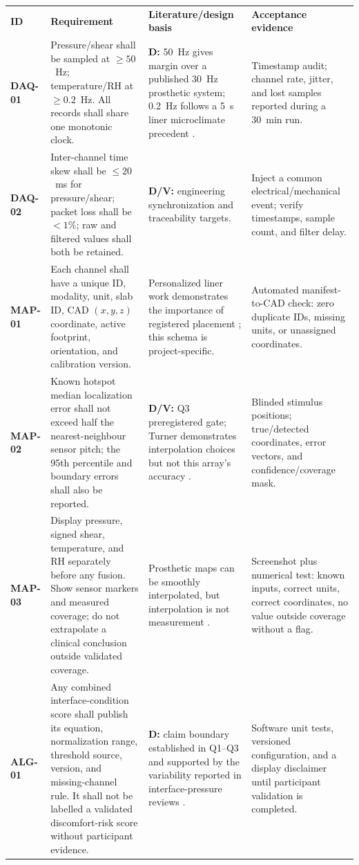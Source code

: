 \vspace{0.45em}
\begingroup
\fontsize{8.2}{9.6}\selectfont
\setlength{\tabcolsep}{3pt}\renewcommand{\arraystretch}{1.11}
\begin{tabularx}{\linewidth}{>{\raggedright\arraybackslash\bfseries\color{AUBRed}}p{1.25cm}Y Y Y}
\color{white}\textbf{ID} & \color{white}\textbf{Requirement} &
\color{white}\textbf{Literature/design basis} & \color{white}\textbf{Acceptance evidence} \\
DAQ-01 & Pressure/shear shall be sampled at $\geq50$~Hz; temperature/RH at
$\geq0.2$~Hz. All records shall share one monotonic clock. & \textbf{D:}
50~Hz gives margin over a published 30~Hz prosthetic system; 0.2~Hz follows a
5~s liner microclimate precedent \cite{q3kwak2020,paterno2020}. & Timestamp
audit; channel rate, jitter, and lost samples reported during a 30~min run. \\
DAQ-02 & Inter-channel time skew shall be $\leq20$~ms for pressure/shear; packet
loss shall be $<1\%$; raw and filtered values shall both be retained. &
\textbf{D/V:} engineering synchronization and traceability targets. & Inject a
common electrical/mechanical event; verify timestamps, sample count, and filter
delay. \\
MAP-01 & Each channel shall have a unique ID, modality, unit, slab ID, CAD
$(x,y,z)$ coordinate, active footprint, orientation, and calibration version. &
Personalized liner work demonstrates the importance of registered placement
\cite{paterno2020}; this schema is project-specific. & Automated manifest-to-CAD
check: zero duplicate IDs, missing units, or unassigned coordinates. \\
MAP-02 & Known hotspot median localization error shall not exceed half the
nearest-neighbour sensor pitch; the 95th percentile and boundary errors shall
also be reported. & \textbf{D/V:} Q3 preregistered gate; Turner demonstrates
interpolation choices but not this array's accuracy \cite{q3turner2021}. &
Blinded stimulus positions; true/detected coordinates, error vectors, and
confidence/coverage mask. \\
MAP-03 & Display pressure, signed shear, temperature, and RH separately before
any fusion. Show sensor markers and measured coverage; do not extrapolate a
clinical conclusion outside validated coverage. & Prosthetic maps can be
smoothly interpolated, but interpolation is not measurement
\cite{q3turner2021}. & Screenshot plus numerical test: known inputs, correct
units, correct coordinates, no value outside coverage without a flag. \\
ALG-01 & Any combined interface-condition score shall publish its equation,
normalization range, threshold source, version, and missing-channel rule. It
shall not be labelled a validated discomfort-risk score without participant
evidence. & \textbf{D:} claim boundary established in Q1--Q3 and supported by
the variability reported in interface-pressure reviews
\cite{q3armitage2026}. & Software unit tests, versioned configuration, and a
display disclaimer until participant validation is completed. \\
\end{tabularx}
